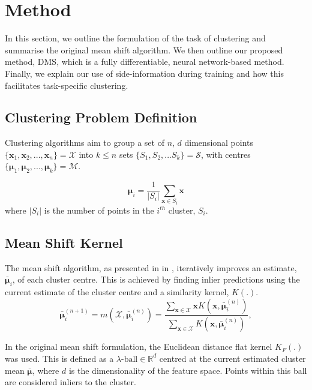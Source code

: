 \documentclass[../thesis.tex]{subfiles}
\begin{document}
\section{Method}\label{sec__DMS__DMS}
In this section, we outline the formulation of the task of clustering and summarise the original mean shift algorithm. We then outline our proposed method, DMS, which is a fully differentiable, neural network-based method.
Finally, we explain our use of side-information during training and how this facilitates task-specific clustering.

\subsection{Clustering Problem Definition}
Clustering algorithms aim to group a set of $n$, $d$ dimensional points $\{\mathbf{x}_1, \mathbf{x}_2, ..., \mathbf{x}_n\} = \mathcal{X}$ into $k \leq n$ sets $\{S_1, S_2, ... S_k\} = \mathcal{S}$, with centres $\{\boldsymbol{\mu}_1, \boldsymbol{\mu}_2, ..., \boldsymbol{\mu}_k\} = \mathcal{M}$. 

\begin{equation}
    \boldsymbol{\mu}_i = {\frac {1}{|S_{i}|}}\sum _{\mathbf {x} \in S_{i}}\mathbf {x}
\end{equation} 
where $|S_{i}|$ is the number of points in the $i^{th}$ cluster, $S_{i}$. 


\subsection{Mean Shift Kernel}\label{sec__DMS__MS_diff_kernel}
The mean shift algorithm, as presented in  in , iteratively improves an estimate, $\bar {\boldsymbol{\mu}}_i$, of each cluster centre.
This is achieved by finding inlier predictions using the current estimate of the cluster centre and a similarity kernel, $K(.)$.
\begin{equation}\label{eq__DMS__mean_shift_second_time}
    \bar {\boldsymbol{\mu}}^{(n+1)}_i = m(\mathcal{X}, \bar {\boldsymbol{\mu}}^{(n)}_i) = \frac{\sum_{\mathbf x \in \mathcal X} \mathbf x K(\mathbf x, \bar {\boldsymbol{\mu}}^{(n)}_i) }{\sum_{\mathbf x \in \mathcal X} K(\mathbf x, \bar{\boldsymbol{\mu}}^{(n)}_i)},
\end{equation}

In the original mean shift formulation, the Euclidean distance flat kernel $K_F(.)$ was used.
This is defined as a $\lambda\text{-ball} \in \mathbb R^d$ centred at the current estimated cluster mean $\bar{\boldsymbol{\mu}}$, where $d$ is the dimensionality of the feature space. Points within this ball are considered inliers to the cluster.
 
\end{document}
